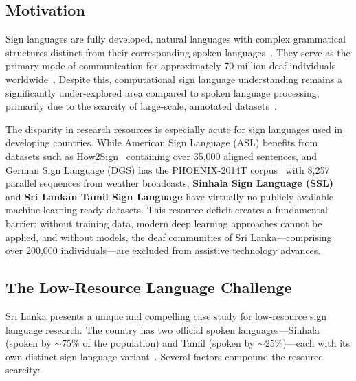 \documentclass[journal]{IEEEtran}
\begin{document}
\subsection{Motivation}

Sign languages are fully developed, natural languages with complex grammatical structures distinct from their corresponding spoken languages~\cite{sandler2006sign}. They serve as the primary mode of communication for approximately 70 million deaf individuals worldwide~\cite{wfd2023}. Despite this, computational sign language understanding remains a significantly under-explored area compared to spoken language processing, primarily due to the scarcity of large-scale, annotated datasets~\cite{koller2020quantitative}.

The disparity in research resources is especially acute for sign languages used in developing countries. While American Sign Language (ASL) benefits from datasets such as How2Sign~\cite{duarte2021how2sign} containing over 35,000 aligned sentences, and German Sign Language (DGS) has the PHOENIX-2014T corpus~\cite{camgoz2018neural} with 8,257 parallel sequences from weather broadcasts, \textbf{Sinhala Sign Language (SSL)} and \textbf{Sri Lankan Tamil Sign Language} have virtually no publicly available machine learning-ready datasets. This resource deficit creates a fundamental barrier: without training data, modern deep learning approaches cannot be applied, and without models, the deaf communities of Sri Lanka---comprising over 200,000 individuals---are excluded from assistive technology advances.

\subsection{The Low-Resource Language Challenge}

Sri Lanka presents a unique and compelling case study for low-resource sign language research. The country has two official spoken languages---Sinhala (spoken by $\sim$75\% of the population) and Tamil (spoken by $\sim$25\%)---each with its own distinct sign language variant~\cite{herath2019sinhala}. Several factors compound the resource scarcity:
\end{document}
